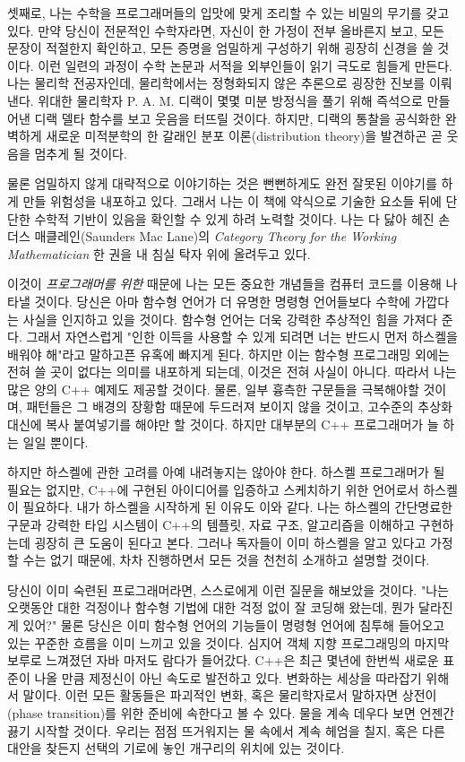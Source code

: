 셋째로, 나는 수학을 프로그래머들의 입맛에 맞게 조리할 수 있는 비밀의 무기를 갖고 있다.
만약 당신이 전문적인 수학자라면, 자신이 한 가정이 전부 올바른지 보고, 모든 문장이 적절한지 확인하고, 모든 증명을 엄밀하게 구성하기 위해 굉장히 신경을 쓸 것이다.
이런 일련의 과정이 수학 논문과 서적을 외부인들이 읽기 극도로 힘들게 만든다. 나는 물리학 전공자인데, 물리학에서는 정형화되지 않은 추론으로 굉장한 진보를 이뤄낸다.
위대한 물리학자 P. A. M. 디랙이 몇몇 미분 방정식을 풀기 위해 즉석으로 만들어낸 디랙 델타 함수를 보고 웃음을 터뜨릴 것이다.
하지만, 디랙의 통찰을 공식화한 완벽하게 새로운 미적분학의 한 갈래인 분포 이론(distribution theory)을 발견하곤 곧 웃음을 멈추게 될 것이다.

물론 엄밀하지 않게 대략적으로 이야기하는 것은 뻔뻔하게도 완전 잘못된 이야기를 하게 만들 위험성을 내포하고 있다.
그래서 나는 이 책에 약식으로 기술한 요소들 뒤에 단단한 수학적 기반이 있음을 확인할 수 있게 하려 노력할 것이다.
나는 다 닳아 헤진 손더스 매클레인(Saunders Mac Lane)의 \emph{Category Theory for the Working Mathematician} 한 권을 내 침실 탁자 위에 올려두고 있다.

이것이 \emph{프로그래머를 위한}  때문에 나는 모든 중요한 개념들을 컴퓨터 코드를 이용해 나타낼 것이다.
당신은 아마 함수형 언어가 더 유명한 명령형 언어들보다 수학에 가깝다는 사실을 인지하고 있을 것이다. 함수형 언어는 더욱 강력한 추상적인 힘을 가져다 준다.
그래서 자연스럽게 "\trCategoryTheory\로 인한 이득을 사용할 수 있게 되려면 너는 반드시 먼저 하스켈을 배워야 해"라고 말하고픈 유혹에 빠지게 된다.
하지만 이는 \trCategoryTheory\가 함수형 프로그래밍 외에는 전혀 쓸 곳이 없다는 의미를 내포하게 되는데, 이것은 전혀 사실이 아니다. 따라서 나는 많은 양의 C++ 예제도 제공할 것이다.
물론, 일부 흉측한 구문들을 극복해야할 것이며, 패턴들은 그 배경의 장황함 때문에 두드러져 보이지 않을 것이고, 고수준의 추상화 대신에 복사 붙여넣기를 해야만 할 것이다.
하지만 대부분의 C++ 프로그래머가 늘 하는 일일 뿐이다.

하지만 하스켈에 관한 고려를 아예 내려놓지는 않아야 한다. 하스켈 프로그래머가 될 필요는 없지만, C++에 구현된 아이디어를 입증하고 스케치하기 위한 언어로서 하스켈이 필요하다.
내가 하스켈을 시작하게 된 이유도 이와 같다. 나는 하스켈의 간단명료한 구문과 강력한 타입 시스템이 C++의 템플릿, 자료 구조, 알고리즘을 이해하고 구현하는데 굉장히 큰 도움이 된다고 본다.
그러나 독자들이 이미 하스켈을 알고 있다고 가정할 수는 없기 때문에, 차차 진행하면서 모든 것을 천천히 소개하고 설명할 것이다.

당신이 이미 숙련된 프로그래머라면, 스스로에게 이런 질문을 해보았을 것이다. 
"나는 오랫동안  대한 걱정이나 함수형 기법에 대한 걱정 없이 잘 코딩해 왔는데, 뭔가 달라진 게 있어?"
물론 당신은 이미 함수형 언어의 기능들이 명령형 언어에 침투해 들어오고 있는 꾸준한 흐름을 이미 느끼고 있을 것이다.
심지어 객체 지향 프로그래밍의 마지막 보루로 느껴졌던 자바 마저도 람다가 들어갔다.
C++은 최근 몇년에 한번씩 새로운 표준이 나올 만큼 제정신이 아닌 속도로 발전하고 있다. 변화하는 세상을 따라잡기 위해서 말이다.
이런 모든 활동들은 파괴적인 변화, 혹은 물리학자로서 말하자면 상전이(phase transition)를 위한 준비에 속한다고 볼 수 있다.
물을 계속 데우다 보면 언젠간 끓기 시작할 것이다. 우리는 점점 뜨거워지는 물 속에서 계속 헤엄을 칠지, 혹은 다른 대안을 찾든지 선택의 기로에 놓인 개구리의 위치에 있는 것이다.

